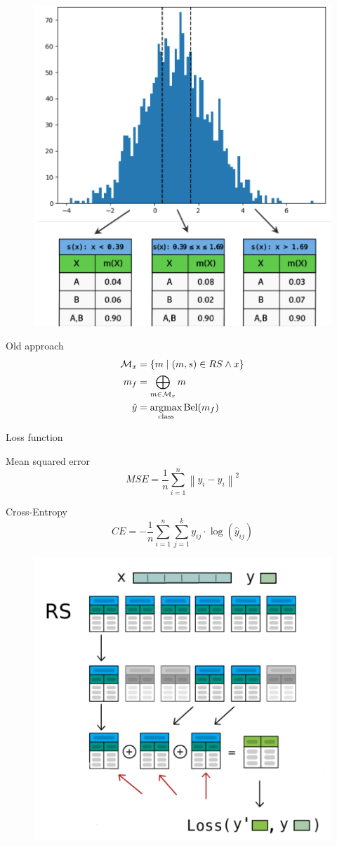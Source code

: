 \documentclass[aspectratio=169]{beamer}
\begin{document}
\begin{frame}
\begin{figure}
    \centering
    \includegraphics[width=0.45\linewidth]{../../fig/image.png}
    \label{fig:image}
\end{figure}
\end{frame}

\begin{frame}{Old approach}
\begin{align*}
\mathcal{M}_x &= \left\{ m \mid (m, s) \in RS \land x \right\} \\
m_f &= \bigoplus_{m \in \mathcal{M}_x} m \\
\hat{y} &= \underset{{\rm class}}{\mathrm{argmax}} \, {\rm Bel}(m_f)
\end{align*}
\end{frame}

\begin{frame}{Loss function}
    \begin{block}{Mean squared error}
        \begin{equation}
MSE = \frac{1}{n} \sum_{i=1}^{n} \left\| y_i - \hat{y}_i \right\|^2
        \end{equation}
    \end{block}
    \begin{block}{Cross-Entropy}
        \begin{equation}
        CE = - \frac{1}{n} \sum_{i=1}^{n} \sum_{j=1}^{k} y_{ij} \cdot \log(\hat{y}_{ij})
        \end{equation}
    \end{block}
\end{frame}

\begin{frame}
\begin{figure}
    \centering
    \includegraphics[width=0.55\linewidth]{../../fig/dst_ill_eng.png}
\end{figure}
\end{frame}
\end{document}

